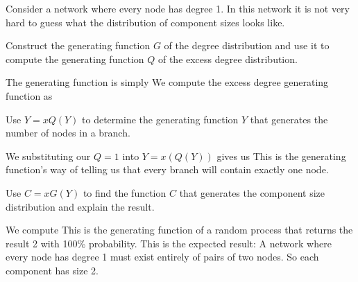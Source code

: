 
Consider a network where every node has degree 1. In this network it is not very hard to guess what the distribution of component sizes looks like. 

\subquestion Construct the generating function $G$ of the degree distribution and use it to compute the generating function $Q$ of the excess degree distribution. 

\solution
The generating function is simply 
We compute the excess degree generating function as

\subquestion Use $Y=xQ(Y)$ to determine the generating function $Y$ that generates the number of nodes in a branch. 

\solution
We substituting our $Q=1$ into $Y=x(Q(Y))$ gives us 
This is the generating function's way of telling us that every branch will contain exactly one node. 

\subquestion Use $C=xG(Y)$ to find the function $C$ that generates the component size distribution and explain the result.

\solution
We compute 
This is the generating function of a random process that returns the result 2 with 100\% probability. This is the expected result: A network where every node has degree 1 must exist entirely of pairs of two nodes. So each component has size 2. 